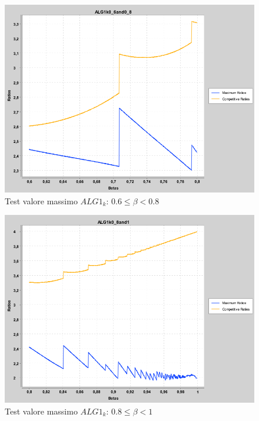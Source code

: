 \documentclass[12pt]{article}
\begin{document}
\begin{figure}[H]
\caption{Test valore massimo $ALG1_{k}$: $0.6 \leq \beta < 0.8$}
\centering
\includegraphics[scale=0.4]{max/ALG1k0_6and0_8.png}
\end{figure}
\begin{figure}[H]
\caption{Test valore massimo $ALG1_{k}$: $0.8 \leq \beta < 1$}
\centering
\includegraphics[scale=0.4]{max/ALG1k0_8and1.png}
\end{figure}
\end{document}
